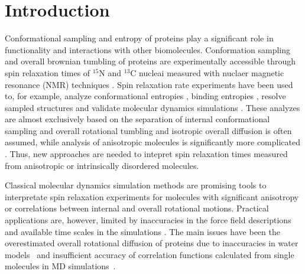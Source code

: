 \documentclass[pre,aps,floatfix,authordate1-4,twocolumn]{revtex4-1}
\begin{document}
\section{Introduction}
Conformational sampling and entropy of proteins
play a significant role in functionality
and interactions with other biomolecules.
Conformation sampling and overall brownian tumbling of proteins
are experimentally accessible through 
spin relaxation times of $^{15}$N and $^{13}$C nucleai measured
with nuclaer magnetic resonance (NMR) 
techniques \cite{jarymowycz06,korzhnev01,mulder01,eisenmesser05,bedem15,lewandowski15,lamley15}. 
Spin relaxation rate experiments have been used to, for example, analyze
conformational entropies \cite{yang96,kasinath13,allner15,jarymowycz06}, binding entropies \cite{akke93,jarymowycz06},
resolve sampled structures \cite{mulder01,eisenmesser05,bedem15,medina14}
and validate molecular dynamics simulations \cite{best04,showalter07a,showalter07b,maragakis08,trbovic08}.
These analyzes are almost exclusively based on the
separation of internal conformational sampling 
and overall rotational tumbling \cite{wennerstrom79,Lipari82} and
isotropic overall diffusion is often assumed, while
analysis of anisotropic molecules is significantly more
complicated \cite{woessner62,shimizu62,jarymowycz06,korzhnev01,luginbuhl97,hall04}.
Thus, new approaches are needed to intepret spin relaxation times
measured from anisotropic or intrinsically disordered molecules.


%

 
Classical molecular dynamics simulation methods are
promising tools to interpretate spin relaxation experiments
for molecules with significant anisotropy or correlations between
internal and overall rotational motions. Practical applications
are, however, limited by inaccuracies in the force field descriptions
and available time scales in the simulations \cite{prompers02,maragakis08,trbovic08,wong08,anderson12}.
The main issues have been the overestimated overall rotational diffusion of proteins
due to inaccuracies in water models~\cite{wong08} and
insufficient accuracy of correlation functions calculated from
single molecules in MD simulations~\cite{lu06,anderson12}.
\end{document}
